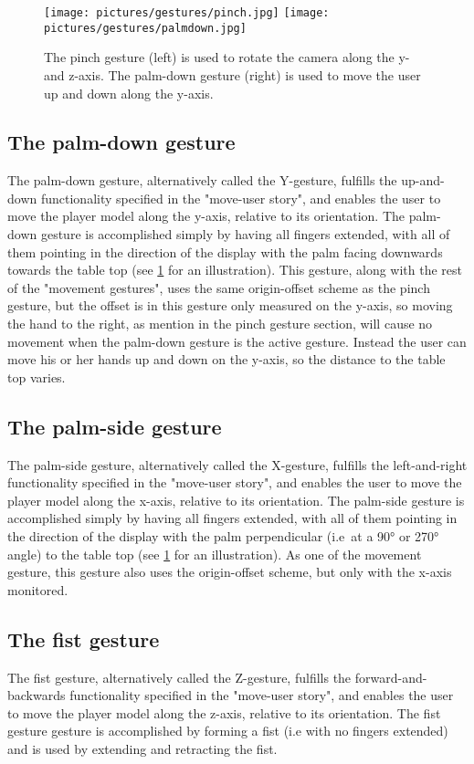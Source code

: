 \begin{figure}%
	\texttt{[image: pictures/gestures/pinch.jpg]}
    \texttt{[image: pictures/gestures/palmdown.jpg]}
	\caption[The pinch and palm-down gestures]{The pinch gesture (left) is used to rotate the camera along the y- and z-axis. 
             The palm-down gesture (right) is used to move the user up and down along the y-axis.}
	\label{fig:gestures1}
\end{figure} 

\subsection{The palm-down gesture}
The palm-down gesture, alternatively called the Y-gesture, fulfills the up-and-down functionality specified in the "move-user story", and enables the user to 
move the player model along the y-axis, relative to its orientation. The palm-down gesture is accomplished simply by having all fingers extended, with all of them pointing in
the direction of the display with the palm facing downwards towards the table top (see \ref{fig:gestures1} for an illustration). This gesture, along with the rest of the 
"movement gestures", uses the same origin-offset scheme as the pinch gesture, but the offset is in this gesture only measured on the y-axis, so moving the hand to the 
right, as mention in the pinch gesture section, will cause no movement when the palm-down gesture is the active gesture. 
Instead the user can move his or her hands up and down on the y-axis, so the distance to the table top varies.  

\subsection{The palm-side gesture}
The palm-side gesture, alternatively called the X-gesture, fulfills the left-and-right functionality specified in the "move-user story", and enables the user to 
move the player model along the x-axis, relative to its orientation. The palm-side gesture is accomplished simply by having all fingers extended, with all of them pointing in
the direction of the display with the palm perpendicular (i.e~at a 90° or 270° angle) to the table top (see \ref{fig:gestures1} for an illustration). 
As one of the movement gesture, this gesture also uses the origin-offset scheme, but only with the x-axis monitored.

\subsection{The fist gesture}
The fist gesture, alternatively called the Z-gesture, fulfills the forward-and-backwards functionality specified in the "move-user story", and enables the user to 
move the player model along the z-axis, relative to its orientation. The fist gesture gesture is accomplished by forming a fist (i.e with no fingers extended)
and is used by extending and retracting the fist. 

